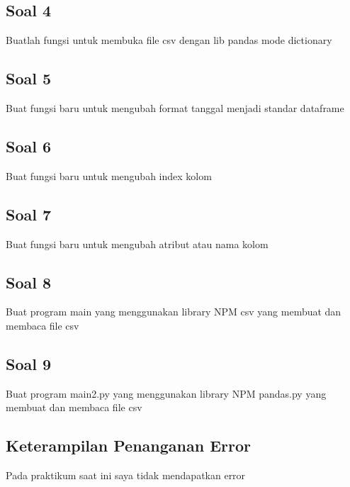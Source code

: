 \subsection{Soal 4}
Buatlah fungsi untuk membuka file csv dengan lib pandas mode dictionary


\subsection{Soal 5}
Buat fungsi baru untuk mengubah format tanggal menjadi standar dataframe


\subsection{Soal 6}
Buat fungsi baru  untuk mengubah index kolom


\subsection{Soal 7}
Buat fungsi baru untuk mengubah atribut atau nama kolom


\subsection{Soal 8}
Buat program main yang menggunakan library NPM csv yang membuat dan membaca file csv




\subsection{Soal 9}
Buat program main2.py yang menggunakan library NPM pandas.py yang membuat dan membaca file csv



\subsection{Keterampilan Penanganan Error}
Pada praktikum saat ini saya tidak mendapatkan error

